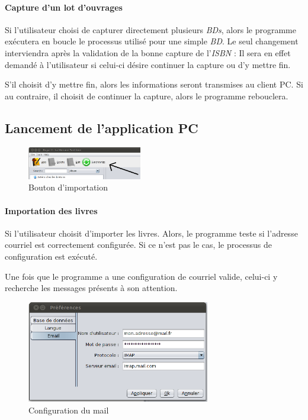 \paragraph{Capture d'un lot d'ouvrages}
Si l'utilisateur choisi de capturer directement plusieurs \emph{BDs}, alors le programme exécutera en boucle le processus utilisé pour une simple \emph{BD}. 
Le seul changement interviendra après la validation de la bonne capture de l'\emph{ISBN} :
Il sera en effet demandé à l'utilisateur si celui-ci désire continuer la capture ou d'y mettre fin. 

S'il choisit d'y mettre fin, alors les informations seront transmises au client PC. 
Si au contraire, il choisit de continuer la capture, alors le programme rebouclera. 

\subsection{Lancement de l'application PC}


\begin{figure}
\includegraphics[width=5cm]{../img/btn_synchro.png}
\caption{Bouton d'importation}
\end{figure}
\paragraph{Importation des livres}
Si l'utilisateur choisit d'importer les livres. Alors, le programme teste si l'adresse courriel est correctement configurée. Si ce n'est pas le cas, le processus de configuration est exécuté. 

Une fois que le programme a une configuration de courriel valide, celui-ci y recherche les messages présents à son attention. 

\begin{figure}
\includegraphics[width=8cm]{../img/preferenceMail.png}
\caption{Configuration du mail}
\end{figure}
